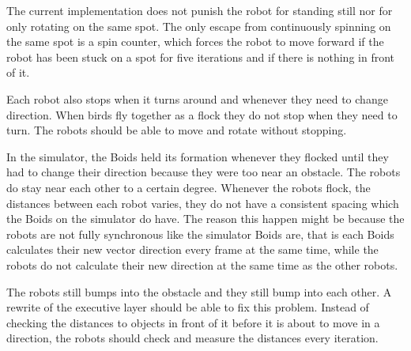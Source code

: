 The current implementation does not punish the robot for standing still nor for only rotating on the same spot. The only escape from continuously spinning on the same spot is a spin counter, which forces the robot to move forward if the robot has been stuck on a spot for five iterations and if there is nothing in front of it. 

Each robot also stops when it turns around and whenever they need to change direction. When birds fly together as a flock they do not stop when they need to turn. The robots should be able to move and rotate without stopping.

In the simulator, the Boids held its formation whenever they flocked until they had to change their direction because they were too near an obstacle. The robots do stay near each other to a certain degree. Whenever the robots flock, the distances between each robot varies, they do not have a consistent spacing which the Boids on the simulator do have. The reason this happen might be because the robots are not fully synchronous like the simulator Boids are, that is each Boids calculates their new vector direction every frame at the same time, while the robots do not calculate their new direction at the same time as the other robots. 

The robots still bumps into the obstacle and they still bump into each other. A rewrite of the executive layer should be able to fix this problem. Instead of checking the distances to objects in front of it before it is about to move in a direction, the robots should check and measure the distances every iteration.








